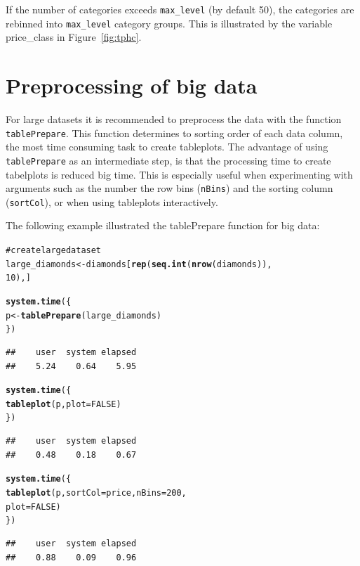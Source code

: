 \documentclass[11pt, fleqn, a4paper]{article}\usepackage{graphicx, color}
\makeatletter
\newcommand{\hlfunctioncall}[1]{\textcolor[rgb]{0.501960784313725,0,0.329411764705882}{\textbf{#1}}}%
\newcommand{\hlcomment}[1]{\textcolor[rgb]{0.180392156862745,0.6,0.341176470588235}{#1}}%
\newenvironment{kframe}{%
 \def\at@end@of@kframe{}%
 \ifinner\ifhmode%
  \def\at@end@of@kframe{\end{minipage}}%
  \begin{minipage}{\columnwidth}%
 \fi\fi%
 \def\FrameCommand##1{\hskip\@totalleftmargin \hskip-\fboxsep
 \colorbox{shadecolor}{##1}\hskip-\fboxsep
     \hskip-\linewidth \hskip-\@totalleftmargin \hskip\columnwidth}%
 \MakeFramed {\advance\hsize-\width
   \@totalleftmargin\z@ \linewidth\hsize
   \@setminipage}}%
 {\par\unskip\endMakeFramed%
 \at@end@of@kframe}
\newenvironment{knitrout}{}{} %
\makeatother
\begin{document}
If the number of categories exceeds {\tt max\_level} (by default 50), the categories are rebinned into {\tt max\_level} category groups. This is illustrated by the variable price\_class in Figure~\ref{fig:tphc}.




\section{Preprocessing of big data}

For large datasets it is recommended to preprocess the data with the function {\tt tablePrepare}. This function determines to sorting order of each data column, the most time consuming task to create tableplots. The advantage of using {\tt tablePrepare} as an intermediate step, is that the processing time to create tabelplots is reduced big time. This is especially useful when experimenting with arguments such as the number the row bins ({\tt nBins}) and the sorting column ({\tt sortCol}), or when using tableplots interactively.

The following example illustrated the tablePrepare function for big data:

\begin{knitrout}
\color{fgcolor}\begin{kframe}
\begin{alltt}
\hlcomment{# create large dataset}
large_diamonds <- diamonds[\hlfunctioncall{rep}(\hlfunctioncall{seq.int}(\hlfunctioncall{nrow}(diamonds)), 
    10), ]

\hlfunctioncall{system.time}(\{
    p <- \hlfunctioncall{tablePrepare}(large_diamonds)
\})
\end{alltt}
\begin{verbatim}
##    user  system elapsed 
##    5.24    0.64    5.95
\end{verbatim}
\begin{alltt}

\hlfunctioncall{system.time}(\{
    \hlfunctioncall{tableplot}(p, plot = FALSE)
\})
\end{alltt}
\begin{verbatim}
##    user  system elapsed 
##    0.48    0.18    0.67
\end{verbatim}
\begin{alltt}

\hlfunctioncall{system.time}(\{
    \hlfunctioncall{tableplot}(p, sortCol = price, nBins = 200, 
        plot = FALSE)
\})
\end{alltt}
\begin{verbatim}
##    user  system elapsed 
##    0.88    0.09    0.96
\end{verbatim}
\end{kframe}
\end{knitrout}
\end{document}
